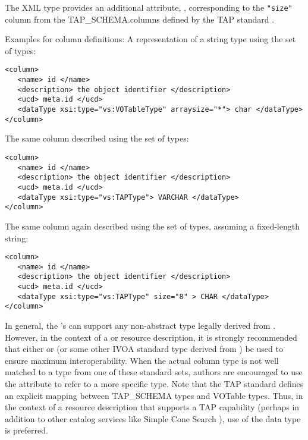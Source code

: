 \documentclass[11pt,a4paper]{ivoa}
\begin{document}




The  XML type provides an additional attribute,
, corresponding to the \verb|"size"| column from the
TAP\_SCHEMA.columns defined by the TAP standard
\citep{TAP}.




Examples for column definitions:
A representation of a string type using the
 set of types:

\begin{lstlisting}
<column>
   <name> id </name>
   <description> the object identifier </description>
   <ucd> meta.id </ucd>
   <dataType xsi:type="vs:VOTableType" arraysize="*"> char </dataType>
</column>
\end{lstlisting}

The same column described using the
 set of types:

\begin{lstlisting}
<column>
   <name> id </name>
   <description> the object identifier </description>
   <ucd> meta.id </ucd>
   <dataType xsi:type="vs:TAPType"> VARCHAR </dataType>
</column>
\end{lstlisting}

The same column again described using the
 set of types, assuming a fixed-length
string:

\begin{lstlisting}
<column>
   <name> id </name>
   <description> the object identifier </description>
   <ucd> meta.id </ucd>
   <dataType xsi:type="vs:TAPType" size="8" > CHAR </dataType>
</column>
\end{lstlisting}



In general, the 's 
can support any non-abstract type legally derived from
.  However, in the context of a
 or 
resource description, it is strongly recommended that either
 or  (or some other IVOA
standard type derived from ) be used to
ensure maximum interoperability.  When the actual column type is not
well matched to a type from one of these standard sets, authors are
encouraged to use the  attribute to refer to
a more specific type.  Note that the TAP standard
\citep{TAP} defines an explicit mapping between
TAP\_SCHEMA types and VOTable types.  Thus, in the context of a
 resource description that supports a
TAP capability (perhaps in addition to other catalog services like
Simple Cone Search \citep{SCS}), use of the
 data type is preferred.
\end{document}
